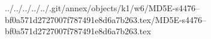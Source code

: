 ../../../../../.git/annex/objects/k1/w6/MD5E-s4476--bf0a571d2727007f787491e8d6a7b263.tex/MD5E-s4476--bf0a571d2727007f787491e8d6a7b263.tex